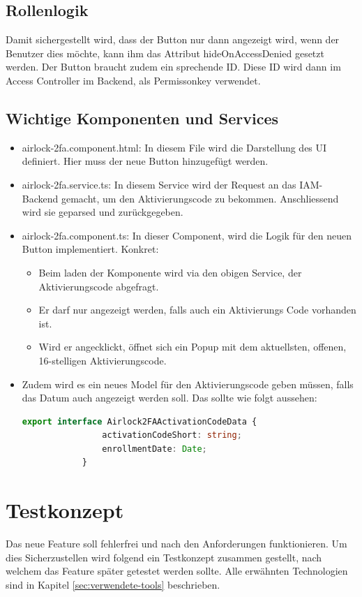 \subsection{Rollenlogik}
Damit sichergestellt wird, dass der Button nur dann angezeigt wird, wenn der Benutzer dies möchte, kann ihm das Attribut \flqq hideOnAccessDenied\frqq{} gesetzt werden. Der Button braucht zudem ein sprechende ID. Diese ID wird dann im Access Controller im Backend, als Permissonkey verwendet.

\subsection{Wichtige Komponenten und Services}
\begin{itemize}
	\item airlock-2fa.component.html: In diesem File wird die Darstellung des UI definiert. Hier muss der neue Button hinzugefügt werden.
	\item airlock-2fa.service.ts: In diesem Service wird der Request an das IAM-Backend gemacht, um den Aktivierungscode zu bekommen. Anschliessend wird sie geparsed und zurückgegeben.
	\item airlock-2fa.component.ts: In dieser Component, wird die Logik für den neuen Button implementiert. Konkret:
	\begin{itemize}
		\item Beim laden der Komponente wird via den obigen Service, der Aktivierungscode abgefragt.  
		\item Er darf nur angezeigt werden, falls auch ein Aktivierungs Code vorhanden ist.
		\item Wird er angecklickt, öffnet sich ein Popup mit dem aktuellsten, offenen, 16-stelligen Aktivierungscode.
	\end{itemize}
	\item Zudem wird es ein neues Model für den Aktivierungscode geben müssen, falls das Datum auch angezeigt werden soll. Das sollte wie folgt aussehen:
		\begin{lstlisting}[language=TypeScript]
			export interface Airlock2FAActivationCodeData {
				activationCodeShort: string;
				enrollmentDate: Date;
			}
		\end{lstlisting}
\end{itemize}

\section{Testkonzept}
Das neue Feature soll fehlerfrei und nach den Anforderungen funktionieren. Um dies Sicherzustellen wird folgend ein Testkonzept zusammen gestellt, nach welchem das Feature später getestet werden sollte.
Alle erwähnten Technologien sind in Kapitel \ref{sec:verwendete-tools} beschrieben.


